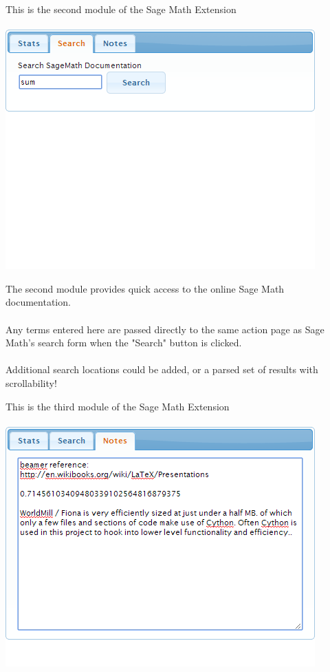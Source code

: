 \documentclass{beamer}
\begin{document}
\begin{frame}
This is the second module of the Sage Math Extension
\\~\\
\includegraphics[width=.9\textwidth]{mod2.png}
\end{frame}

\begin{frame}
The second module provides quick access to the online Sage Math documentation.
\\~\\
Any terms entered here are passed directly to the same action page as Sage Math's search form when the "Search" button is clicked.
\\~\\
Additional search locations could be added, or a parsed set of results with scrollability!
\end{frame}

\begin{frame}
This is the third module of the Sage Math Extension
\\~\\
\includegraphics[width=.9\textwidth]{mod3.png}
\end{frame}
\end{document}
